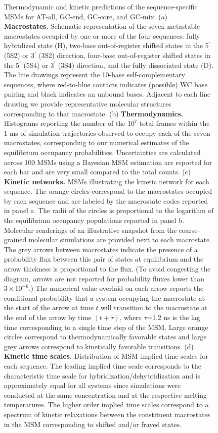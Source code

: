 \documentclass[journal=jpcbfk,manuscript=article]{achemso}
\begin{document}
\begin{figure}[ht!]
        \caption{Thermodynamic and kinetic predictions of the sequence-specific MSMs for AT-all, GC-end, GC-core, and GC-mix. (a) \textbf{Macrostates.} Schematic representation of the seven metastable macrostates occupied by one or more of the four sequences: fully hybridized state (H), two-base out-of-register shifted states in the 5$^\prime$ (5S2) or 3$^\prime$ (3S2) direction, four-base out-of-register shifted states in the 5$^\prime$ (5S4) or 3$^\prime$ (3S4) direction, and the fully dissociated state (D). The line drawings represent the 10-base self-complementary sequences, where red-to-blue contacts indicates (possible) WC base pairing and black indicates an unbound bases. Adjacent to each line drawing we provide representative molecular structures corresponding to that macrostate. (b) \textbf{Thermodynamics.} Histograms reporting the number of the $10^7$ total frames within the 1 ms of simulation trajectories observed to occupy each of the seven macrostates, corresponding to our numerical estimates of the equilibrium occupancy probabilities. Uncertainties are calculated across 100 MSMs using a Bayesian MSM estimation are reported for each bar and are very small compared to the total counts. (c) \textbf{Kinetic networks.} MSMs illustrating the kinetic network for each sequence. The orange circles correspond to the macrostates occupied by each sequence and are labeled by the macrostate codes reported in panel a. The radii of the circles is proportional to the logarithm of the equilibrium occupancy populations reported in panel b. Molecular renderings of an illustrative snapshot from the coarse-grained molecular simulations are provided next to each macrostate. The grey arrows between macrostates indicate the presence of a probability flux between this pair of states at equilibrium and the arrow thickness is proportional to the flux. (To avoid congesting the diagram, arrows are not reported for probability fluxes lower than $3\times10^{-6}$.) The numerical value overlaid on each arrow reports the conditional probability that a system occupying the macrostate at the start of the arrow at time $t$ will transition to the macrostate at the end of the arrow by time $(t+\tau)$, where $\tau$=1.2 ns is the lag time corresponding to a single time step of the MSM. Large orange circles correspond to thermodynamically favorable states and large grey arrows correspond to kinetically favorable transitions. (d) \textbf{Kinetic time scales.} Distribution of MSM implied time scales for each sequence. The leading implied time scale corresponds to the characteristic time scale for hybridization/dehybridization and is approximately equal for all systems since simulations were conducted at the same concentration and at the respective melting temperatures. The higher order implied time scales correspond to a spectrum of kinetic relaxations between the constituent macrostates in the MSM corresponding to shifted and/or frayed states.
    }
    \label{fig:allseq_table}
\end{figure}
\end{document}
